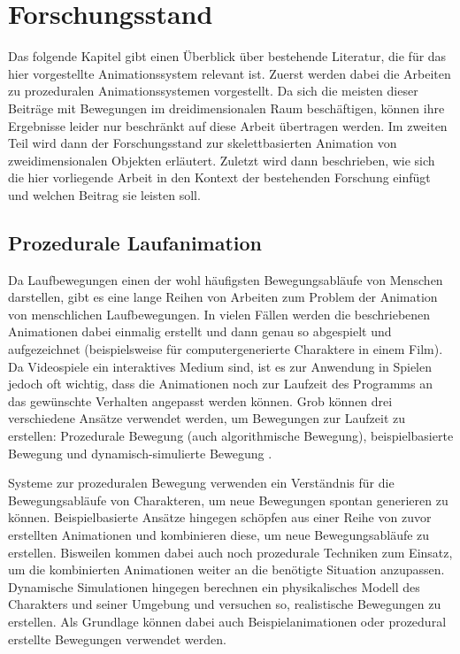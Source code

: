 \chapter{Forschungsstand}
Das folgende Kapitel gibt einen Überblick über bestehende Literatur, die für das hier vorgestellte Animationssystem relevant ist. Zuerst werden dabei die Arbeiten zu prozeduralen Animationssystemen vorgestellt. Da sich die meisten dieser Beiträge mit Bewegungen im dreidimensionalen Raum beschäftigen, können ihre Ergebnisse leider nur beschränkt auf diese Arbeit übertragen werden. Im zweiten Teil wird dann der Forschungsstand zur skelettbasierten Animation von zweidimensionalen Objekten erläutert. Zuletzt wird dann beschrieben, wie sich die hier vorliegende Arbeit in den Kontext der bestehenden Forschung einfügt und welchen Beitrag sie leisten soll.


\section{Prozedurale Laufanimation}
Da Laufbewegungen einen der wohl häufigsten Bewegungsabläufe von Menschen darstellen, gibt es eine lange Reihen von Arbeiten zum Problem der Animation von menschlichen Laufbewegungen. In vielen Fällen werden die beschriebenen Animationen dabei einmalig erstellt und dann genau so abgespielt und aufgezeichnet (beispielsweise für computergenerierte Charaktere in einem Film). Da Videospiele ein interaktives Medium sind, ist es zur Anwendung in Spielen jedoch oft wichtig, dass die Animationen noch zur Laufzeit des Programms an das gewünschte Verhalten angepasst werden können. Grob können drei verschiedene Ansätze verwendet werden, um Bewegungen zur Laufzeit zu erstellen: Prozedurale Bewegung (auch algorithmische Bewegung), beispielbasierte Bewegung und dynamisch-simulierte Bewegung \cite{johansen2009automated}.

Systeme zur prozeduralen Bewegung verwenden ein Verständnis für die Bewegungsabläufe von Charakteren, um neue Bewegungen spontan generieren zu können. Beispielbasierte Ansätze hingegen schöpfen aus einer Reihe von zuvor erstellten Animationen und kombinieren diese, um neue Bewegungsabläufe zu erstellen. Bisweilen kommen dabei auch noch prozedurale Techniken zum Einsatz, um die kombinierten Animationen weiter an die benötigte Situation anzupassen. Dynamische Simulationen hingegen berechnen ein physikalisches Modell des Charakters und seiner Umgebung und versuchen so, realistische Bewegungen zu erstellen. Als Grundlage können dabei auch Beispielanimationen oder prozedural erstellte Bewegungen verwendet werden.

